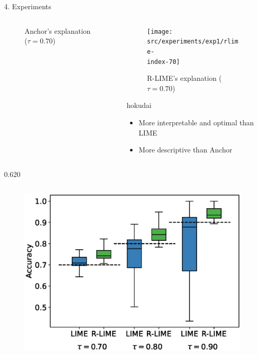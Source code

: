\documentclass[unicode]{beamer}
\begin{document}
\begin{frame}
\begin{columns}[t]
\begin{column}{\lcol\textwidth}
\begin{block}{4. Experiments}
\begin{columns}[t]
\begin{column}{.290\textwidth}
\begin{figure}
              \vspace{-1.8em}
              \caption{Anchor's explanation ($\tau=0.70$)}
            \end{figure}
          \end{column}
          \begin{column}{.295\textwidth}
            \vspace{-0.4em}
            \begin{figure}
              \texttt{[image: src/experiments/exp1/rlime-\\index-70]}

              \vspace{-0.1em}
              \caption{R-LIME's explanation ($\tau=0.70$)}
            \end{figure}
            \vspace{0.8em}
            \begin{beamercolorbox}[colsep=0.1cm,rounded=true,shadow=true]{hokudai}
              \begin{itemize}
                \setlength{\itemsep}{0.3em}
                \item More interpretable and optimal than LIME
                \item More descriptive than Anchor
              \end{itemize}
              \vspace{0.5em}
            \end{beamercolorbox}
          \end{column}
        \end{columns}
        \begin{columns}
          \def\lcol{0.620}
          \def\rcol{0.295}
          \begin{column}{\lcol\textwidth}
            \vspace{-2.5em}
            \begin{columns}[t]
              \begin{column}{.509\textwidth}
                \begin{figure}
                  \includegraphics[width=.88\textwidth]{src/experiments/exp2/box_plot}

\end{figure}
\end{column}
\end{columns}
\end{column}
\end{columns}
\end{block}
\end{column}
\end{columns}
\end{frame}
\end{document}
